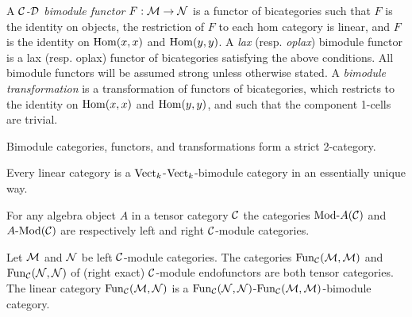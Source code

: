 \documentclass{amsart}
\begin{document}
\begin{definition}		
A {\em $\mathcal C$-$\mathcal D$ bimodule functor} $F:\mathcal M \to \mathcal N$ is a functor of bicategories such that %
		 $F$ is the identity on objects,
		  the restriction of $F$ to each hom category is linear,
		 and $F$ is the identity on $\operatorname{Hom}(x,x)$ and $\operatorname{Hom}(y,y)$.
A {\em lax} (resp. {\em oplax}) bimodule functor is a lax (resp. oplax) functor of bicategories satisfying the above conditions. All bimodule functors will be assumed strong unless otherwise stated. 
	A {\em bimodule transformation} is a transformation of functors of bicategories, which restricts to the identity on $\operatorname{Hom}(x,x)$ and $\operatorname{Hom}(y,y)$, and such that the component 1-cells are trivial.  
\end{definition}
	
%
Bimodule categories, functors, and transformations form a strict 2-category.

\begin{example}
	Every linear category is a $\mathrm{Vect}_k$-$\mathrm{Vect}_k$-bimodule category in an essentially unique way. 
\end{example}

\begin{example}
	For any algebra object $A$ in a tensor category $\mathcal C$ the categories $\Mod{}{A}(\cC)$ and $\Mod{A}{}(\cC)$ are respectively left and right $\mathcal C$-module categories. 
\end{example}

\begin{example}
	Let $\mathcal M$ and $\mathcal N$ be left $\mathcal C$-module categories. The categories $\operatorname{Fun}_{\mathcal C}(\mathcal M, \mathcal M)$ and $\operatorname{Fun}_{\mathcal C}(\mathcal N, \mathcal N)$ of (right exact) $\mathcal C$-module endofunctors are both tensor categories. The linear category $\operatorname{Fun}_{\mathcal C}(\mathcal M, \mathcal N)$ is a $\operatorname{Fun}_{\mathcal C}(\mathcal N, \mathcal N)$-$\operatorname{Fun}_{\mathcal C}(\mathcal M, \mathcal M)$-bimodule category.   
\end{example}
\end{document}
